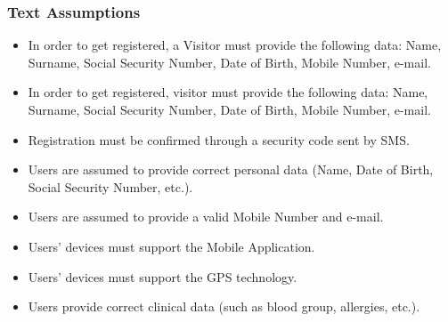 \documentclass[12pt,a4paper]{article}
\begin{document}
	\subsubsection{Text Assumptions}
	\begin{itemize}
		\item In order to get registered, a Visitor must provide the following data: Name, Surname, Social Security Number, Date of Birth, Mobile Number, e-mail.
		\item In order to get registered, visitor must provide the following data: Name, Surname, Social Security Number, Date of Birth, Mobile Number, e-mail.
		\item Registration must be confirmed through a security code sent by SMS.
		\item Users are assumed to provide correct personal data (Name, Date of Birth, Social Security Number, etc.).
		\item Users are assumed to provide a valid Mobile Number and e-mail.
		\item Users' devices must support the Mobile Application.
		\item Users' devices must support the GPS technology.
		\item Users provide correct clinical data (such as blood group, allergies, etc.).
	\end{itemize}
\end{document}
